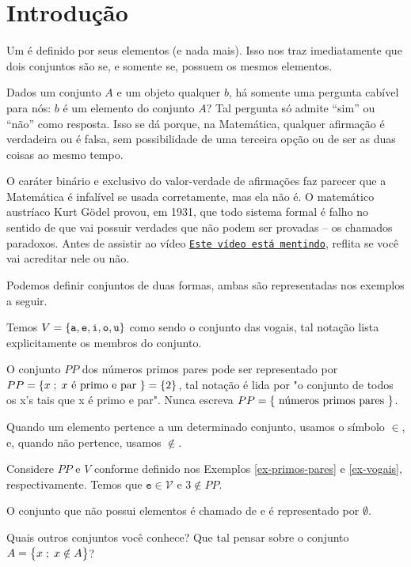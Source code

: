 \section{Introdução}
Um  é definido por seus elementos (e nada mais). Isso nos traz imediatamente que dois conjuntos são  se, e somente se, possuem os mesmos elementos.

Dados um conjunto $A$ e um objeto qualquer $b$, há somente uma pergunta cabível para nós: $b$ é um elemento do conjunto $A$? Tal pergunta só admite ``sim'' ou ``não'' como resposta. Isso se dá porque, na Matemática, qualquer afirmação é verdadeira ou é falsa, sem possibilidade de uma terceira opção ou de ser as duas coisas ao mesmo tempo. 

O caráter binário e exclusivo do valor-verdade de afirmações faz parecer que a Matemática é infalível se usada corretamente, mas ela não é. O matemático austríaco Kurt Gödel provou, em 1931, que todo sistema formal é falho no sentido de que vai possuir verdades que não podem ser provadas -- os chamados paradoxos. Antes de assistir ao vídeo \href{https://youtu.be/UI1xR_AECrU}{{\tt Este vídeo está mentindo}}, reflita se você vai acreditar nele ou não.

\begin{remark}
Podemos definir conjuntos de duas formas, ambas são representadas nos exemplos a seguir.
\end{remark}

\begin{example}
\label{ex-vogais}
Temos $V=\left\{\texttt{a}, \texttt{e}, \texttt{i}, \texttt{o}, \texttt{u}\right\}$ como sendo o conjunto das vogais, tal notação lista explicitamente os membros do conjunto.
\end{example}

\begin{example}
\label{ex-primos-pares}
O conjunto $PP$ dos números primos pares pode ser representado por $PP = \left\{x \;;\; x \text{ é primo e par }\right\} = \left\{2\right\}$, tal notação é lida por "o conjunto de todos os x's tais que x é primo e par". Nunca escreva $PP = \left\{\text{ números primos pares }\right\}$.
\end{example}

\begin{remark}
Quando um elemento pertence a um determinado conjunto, usamos o símbolo $\in$, e, quando não pertence, usamos $\notin$.
\end{remark}

\begin{example}
Considere $PP$ e $V$ conforme definido nos Exemplos \ref{ex-primos-pares} e \ref{ex-vogais}, respectivamente. Temos que $\texttt{e} \in \mathcal{V}$ e $3 \notin PP$.
\end{example}

\begin{definition}
O conjunto que não possui elementos é chamado de  e é representado por $\emptyset$.
\end{definition}

\begin{example}
Quais outros conjuntos você conhece? Que tal pensar sobre o conjunto $A = \left\{x \;;\; x \notin A\right\}$?
\end{example}
